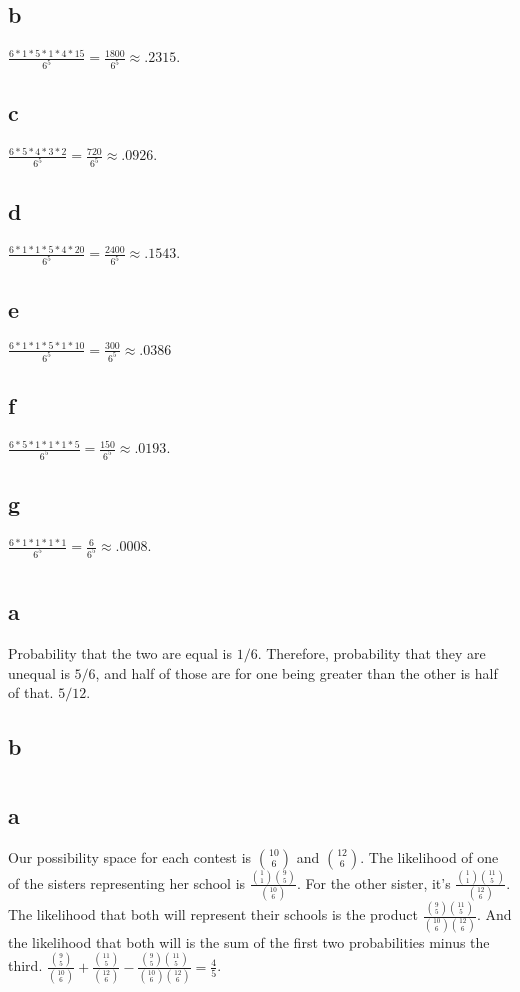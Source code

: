 \documentclass[12pt]{article}
\begin{document}
\subsection*{b}
\(\frac{6*1*5*1*4*15}{6^5} = \frac{1800}{6^5} \approx .2315\).
\subsection*{c}
\(\frac{6*5*4*3*2}{6^5} = \frac{720}{6^5} \approx .0926\).
\subsection*{d}
\(\frac{6*1*1*5*4*20}{6^5} = \frac{2400}{6^5} \approx .1543\).
\subsection*{e}
\(\frac{6*1*1*5*1*10}{6^5} = \frac{300}{6^5} \approx .0386\)
\subsection*{f}
\(\frac{6*5*1*1*1*5}{6^5} = \frac{150}{6^5} \approx .0193\).
\subsection*{g}
\(\frac{6*1*1*1*1}{6^5} = \frac{6}{6^5} \approx .0008\).
\section{}
\subsection*{a}
Probability that the two are equal is \(1/6\). Therefore, probability that they are unequal is \(5/6\), and half of those are for one being greater than the other is half of that. \(5/12\).
\subsection*{b}

\section{}
\subsection*{a}
Our possibility space for each contest is \(\binom{10}{6}\) and \(\binom{12}{6}\).
The likelihood of one of the sisters representing her school is \(\frac{\binom{1}{1}\binom{9}{5}}{\binom{10}{6}}\). For the other sister, it's \(\frac{\binom{1}{1}\binom{11}{5}}{\binom{12}{6}}\). The likelihood that both will represent their schools is the product \(\frac{\binom{9}{5}\binom{11}{5}}{\binom{10}{6}\binom{12}{6}}\). And the likelihood that both will is the sum of the first two probabilities minus the third. \(\frac{\binom{9}{5}}{\binom{10}{6}}+\frac{\binom{11}{5}}{\binom{12}{6}}-\frac{\binom{9}{5}\binom{11}{5}}{\binom{10}{6}\binom{12}{6}}=\frac{4}{5}\).
\end{document}
